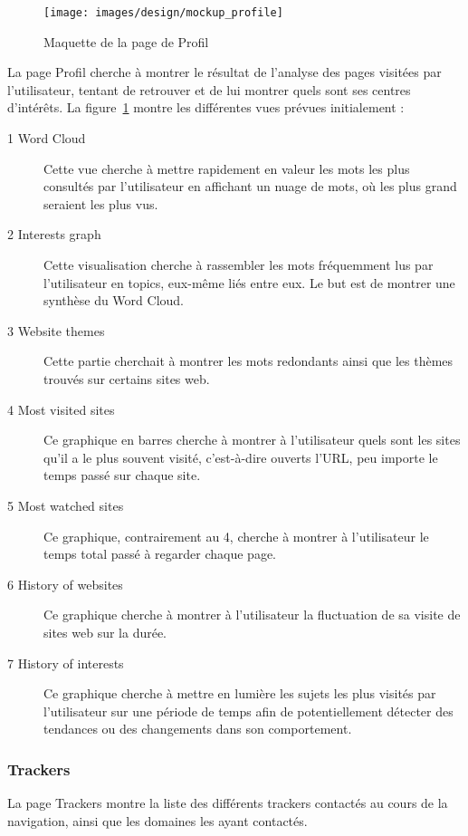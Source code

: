 			\begin{figure}[!h]
				\centering
				\texttt{[image: images/design/mockup\_profile]}
				\caption{Maquette de la page de Profil}
				\label{d-mockup-profile}
			\end{figure}

			La page Profil cherche à montrer le résultat de l'analyse des pages visitées par l'utilisateur, tentant de retrouver et de lui montrer quels sont ses centres d'intérêts. La figure~\ref{d-mockup-profile} montre les différentes vues prévues initialement :

			\begin{description}
				\item[1 Word Cloud] Cette vue cherche à mettre rapidement en valeur les mots les plus consultés par l'utilisateur en affichant un nuage de mots, où les plus grand seraient les plus vus. 
				\item[2 Interests graph] Cette visualisation cherche à rassembler les mots fréquemment lus par l'utilisateur en topics, eux-même liés entre eux. Le but est de montrer une synthèse du Word Cloud.
				\item[3 Website themes] Cette partie cherchait à montrer les mots redondants ainsi que les thèmes trouvés sur certains sites web.
				\item[4 Most visited sites] Ce graphique en barres cherche à montrer à l'utilisateur quels sont les sites qu'il a le plus souvent visité, c'est-à-dire ouverts l'URL, peu importe le temps passé sur chaque site.
				\item[5 Most watched sites] Ce graphique, contrairement au 4, cherche à montrer à l'utilisateur le temps total passé à regarder chaque page.
				\item[6 History of websites] Ce graphique cherche à montrer à l'utilisateur la fluctuation de sa visite de sites web sur la durée.
				\item[7 History of interests] Ce graphique cherche à mettre en lumière les sujets les plus visités par l'utilisateur sur une période de temps afin de potentiellement détecter des tendances ou des changements dans son comportement.
			\end{description}

		\FloatBarrier

		\subsubsection{Trackers}

			La page Trackers montre la liste des différents trackers contactés au cours de la navigation, ainsi que les domaines les ayant contactés.

